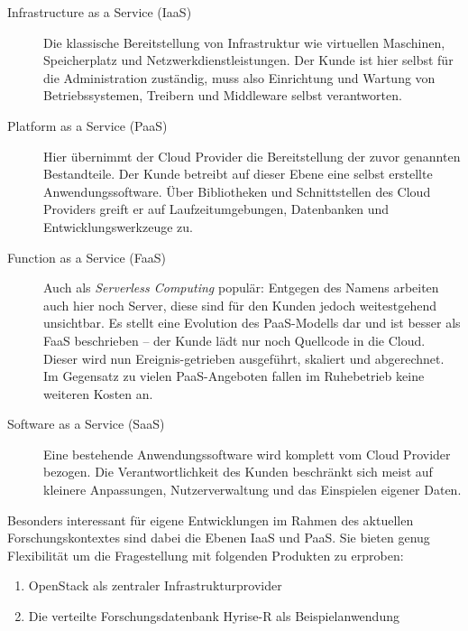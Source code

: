 \begin{description}
	
	\item[Infrastructure as a Service (IaaS)] Die klassische Bereitstellung von Infrastruktur wie virtuellen Maschinen, Speicherplatz und Netzwerkdienstleistungen. Der Kunde ist hier selbst für die Administration zuständig, muss also Einrichtung und Wartung von Betriebssystemen, Treibern und Middleware selbst verantworten.
	
	\item[Platform as a Service (PaaS)] Hier übernimmt der Cloud Provider die Bereitstellung der zuvor genannten Bestandteile. Der Kunde betreibt auf dieser Ebene eine selbst erstellte Anwendungssoftware. Über Bibliotheken und Schnittstellen des Cloud Providers greift er auf Laufzeitumgebungen, Datenbanken und Entwicklungswerkzeuge zu.
	
	\item[Function as a Service (FaaS)] Auch als \emph{Serverless Computing} populär: Entgegen des Namens arbeiten auch hier noch Server, diese sind für den Kunden jedoch weitestgehend unsichtbar. Es stellt eine Evolution des PaaS-Modells dar und ist besser als FaaS beschrieben -- der Kunde lädt nur noch Quellcode in die Cloud. Dieser wird nun Ereignis-getrieben ausgeführt, skaliert und abgerechnet. Im Gegensatz zu vielen PaaS-Angeboten fallen im Ruhebetrieb keine weiteren Kosten an.
	
	\item[Software as a Service (SaaS)] Eine bestehende Anwendungssoftware wird komplett vom Cloud Provider bezogen. Die Verantwortlichkeit des Kunden beschränkt sich meist auf kleinere Anpassungen, Nutzerverwaltung und das Einspielen eigener Daten.
	
\end{description}

\noindent
Besonders interessant für eigene Entwicklungen im Rahmen des aktuellen Forschungskontextes sind dabei die Ebenen IaaS und PaaS. Sie bieten genug Flexibilität um die Fragestellung mit folgenden Produkten zu erproben:

\begin{enumerate}
	\item OpenStack als zentraler Infrastrukturprovider
	\item Die verteilte Forschungsdatenbank Hyrise-R als Beispielanwendung
\end{enumerate}

